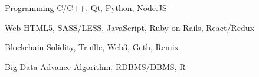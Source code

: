 


\begin{cvskills}


\cvskill
{Programming} %
{C/C++, Qt, Python, Node.JS} %


\cvskill
{Web} %
{HTML5, SASS/LESS, JavaScript, Ruby on Rails, React/Redux} %


\cvskill
{Blockchain} %
{Solidity, Truffle, Web3, Geth, Remix} %


\cvskill
{Big Data} %
{Advance Algorithm, RDBMS/DBMS, R}

\end{cvskills}